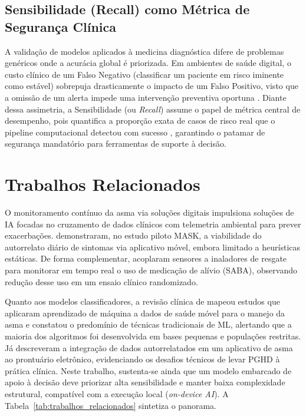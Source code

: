 \documentclass[12pt]{article}
\begin{document}
\subsection{Sensibilidade (Recall) como Métrica de Segurança Clínica}
A validação de modelos aplicados à medicina diagnóstica difere de problemas genéricos onde a acurácia global é priorizada. Em ambientes de saúde digital, o custo clínico de um Falso Negativo (classificar um paciente em risco iminente como estável) sobrepuja drasticamente o impacto de um Falso Positivo, visto que a omissão de um alerta impede uma intervenção preventiva oportuna \cite{altman1994}. Diante dessa assimetria, a Sensibilidade (ou \textit{Recall}) assume o papel de métrica central de desempenho, pois quantifica a proporção exata de casos de risco real que o pipeline computacional detectou com sucesso \cite{altman1994}, garantindo o patamar de segurança mandatório para ferramentas de suporte à decisão.

\section{Trabalhos Relacionados} \label{sec:relacionados}

O monitoramento contínuo da asma via soluções digitais impulsiona soluções de IA focadas no cruzamento de dados clínicos com telemetria ambiental para prever exacerbações.  demonstraram, no estudo piloto MASK, a viabilidade do autorrelato diário de sintomas via aplicativo móvel, embora limitado a heurísticas estáticas. De forma complementar,  acoplaram sensores a inaladores de resgate para monitorar em tempo real o uso de medicação de alívio (SABA), observando redução desse uso em um ensaio clínico randomizado.

Quanto aos modelos classificadores, a revisão clínica de  mapeou estudos que aplicaram aprendizado de máquina a dados de saúde móvel para o manejo da asma e constatou o predomínio de técnicas tradicionais de ML, alertando que a maioria dos algoritmos foi desenvolvida em bases pequenas e populações restritas. Já  descreveram a integração de dados autorrelatados em um aplicativo de asma ao prontuário eletrônico, evidenciando os desafios técnicos de levar PGHD à prática clínica. Neste trabalho, sustenta-se ainda que um modelo embarcado de apoio à decisão deve priorizar alta sensibilidade e manter baixa complexidade estrutural, compatível com a execução local (\textit{on-device AI}). A Tabela~\ref{tab:trabalhos_relacionados} sintetiza o panorama.
\end{document}
